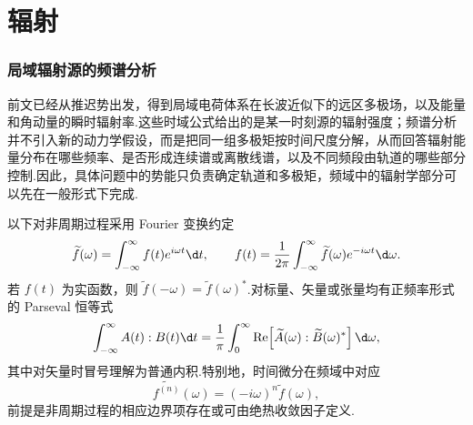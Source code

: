 
\section{辐射}


\subsubsection{局域辐射源的频谱分析}

前文已经从推迟势出发，得到局域电荷体系在长波近似下的远区多极场，以及能量和角动量的瞬时辐射率.这些时域公式给出的是某一时刻源的辐射强度；频谱分析并不引入新的动力学假设，而是把同一组多极矩按时间尺度分解，从而回答辐射能量分布在哪些频率、是否形成连续谱或离散线谱，以及不同频段由轨道的哪些部分控制.因此，具体问题中的势能只负责确定轨道和多极矩，频域中的辐射学部分可以先在一般形式下完成.

以下对非周期过程采用 Fourier 变换约定
\begin{equation}
 \widetilde f(\omega)=\int_{-\infty}^{\infty}f(t)e^{i\omega t}\d t,
 \qquad
 f(t)=\frac{1}{2\pi}\int_{-\infty}^{\infty}\widetilde f(\omega)e^{-i\omega t}\d\omega.
 \label{eq:fourier-convention-coulomb-spectrum}
\end{equation}
若 $f(t)$ 为实函数，则 $\widetilde f(-\omega)=\widetilde f(\omega)^*$.对标量、矢量或张量均有正频率形式的 Parseval 恒等式
\begin{equation}
 \int_{-\infty}^{\infty} A(t):B(t)\d t
 =\frac{1}{\pi}\int_0^\infty
 \operatorname{Re}\!\left[\widetilde A(\omega):\widetilde B(\omega)^*\right]\d\omega,
 \label{eq:positive-frequency-parseval}
\end{equation}
其中对矢量时冒号理解为普通内积.特别地，时间微分在频域中对应
\begin{equation}
 \widetilde{f^{(n)}}(\omega)=(-i\omega)^n\widetilde f(\omega),
 \label{eq:frequency-derivative-rule}
\end{equation}
前提是非周期过程的相应边界项存在或可由绝热收敛因子定义.

